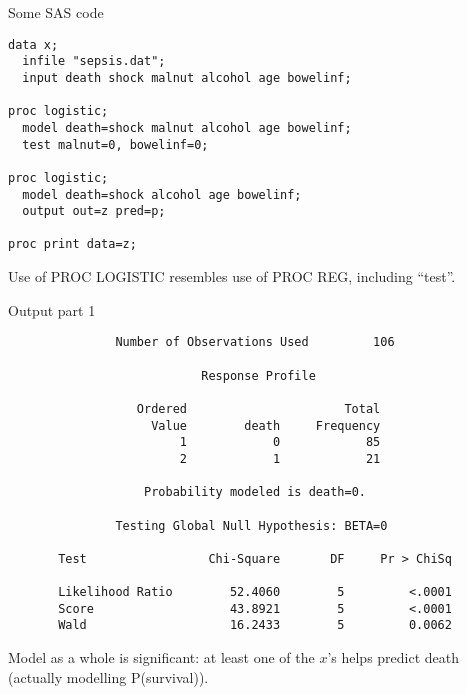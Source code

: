 \documentclass[pdf]{prosper}
\begin{document}
\begin{slide}{Some SAS code}

\begin{verbatim}
data x;
  infile "sepsis.dat";
  input death shock malnut alcohol age bowelinf;

proc logistic;
  model death=shock malnut alcohol age bowelinf;
  test malnut=0, bowelinf=0;

proc logistic;
  model death=shock alcohol age bowelinf;
  output out=z pred=p;

proc print data=z;

\end{verbatim}

  Use of PROC LOGISTIC resembles use of PROC REG, including ``test''.
  
\end{slide}

\begin{slide}{Output part 1}

{\scriptsize
\begin{verbatim}
               Number of Observations Used         106

                           Response Profile
 
                  Ordered                      Total
                    Value        death     Frequency
                        1            0            85
                        2            1            21

                   Probability modeled is death=0.

               Testing Global Null Hypothesis: BETA=0
 
       Test                 Chi-Square       DF     Pr > ChiSq

       Likelihood Ratio        52.4060        5         <.0001
       Score                   43.8921        5         <.0001
       Wald                    16.2433        5         0.0062

\end{verbatim}
}

Model as a whole is significant: at least one of the $x$'s helps predict death (actually modelling P(survival)).

\end{slide}
\end{document}
